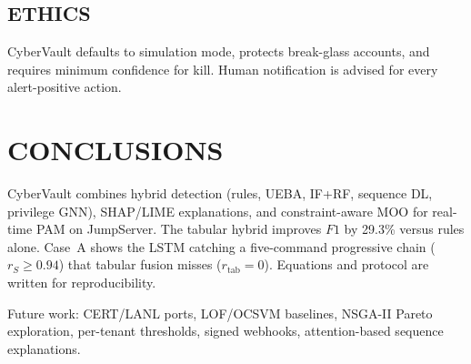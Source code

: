 \subsection{ETHICS}
CyberVault defaults to simulation mode, protects break-glass accounts, and requires minimum confidence for kill. Human notification is advised for every alert-positive action.

\section{CONCLUSIONS}
\label{art-sec:conclusion}

CyberVault combines hybrid detection (rules, UEBA, IF+RF, sequence DL, privilege GNN), SHAP/LIME explanations, and constraint-aware MOO for real-time PAM on JumpServer. The tabular hybrid improves $F1$ by 29.3\% versus rules alone. Case~A shows the LSTM catching a five-command progressive chain ($r_S\geq 0.94$) that tabular fusion misses ($r_{\mathrm{tab}}=0$). Equations and protocol are written for reproducibility.

Future work: CERT/LANL ports, LOF/OCSVM baselines, NSGA-II Pareto exploration, per-tenant thresholds, signed webhooks, attention-based sequence explanations.


